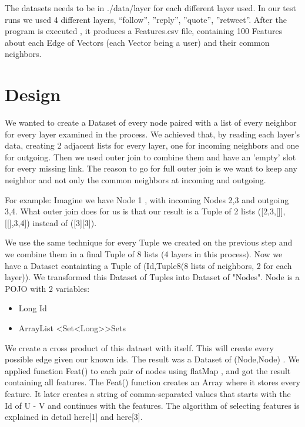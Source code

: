 The datasets needs to be in ./data/{layer} for each different layer used. \newline 
In our test runs we used 4 different layers, “follow”, ”reply”, ”quote”, ”retweet”.
After the program is executed , it produces a Features.csv file, containing 100 Features about each Edge of Vectors (each Vector being a user) and their common neighbors. 




\section{Design}
We wanted to create a Dataset of every node paired with a list of every neighbor for every layer examined in the process. We achieved that, by reading each layer's data, creating 2 adjacent lists for every layer, one for incoming neighbors and one for outgoing. Then we used outer join to combine them and have an 'empty' slot for every missing link. The reason to go for full outer join is we want to keep any neighbor and not only the common neighbors at incoming and outgoing.

For example: Imagine we have Node 1 , with incoming Nodes 2,3 and outgoing 3,4. What outer join does for us is that our result is a Tuple of 2 lists ([2,3,[]],[[],3,4]) instead of ([3][3]).

We use the same technique for every Tuple we created on the previous step and we combine them in a final Tuple of 8 lists (4 layers in this process).  Now we have a Dataset containting a Tuple of (Id,Tuple8(8 lists of neighbors, 2 for each layer)). 
We transformed this Dataset of Tuples into Dataset of "Nodes". Node is a POJO with 2 variables: 
\begin{itemize}
    \item Long Id
    \item ArrayList \textless Set\textless Long\textgreater \textgreater  Sets
\end{itemize}

We create a cross product of this dataset with itself. This will create every possible edge given our known ids. The result was a Dataset of (Node,Node) . We applied function Feat() to each pair of nodes using flatMap , and got the result containing all features. The Feat() function creates an Array where it stores every feature. It later creates a string of comma-separated values that starts with the Id of U - V and continues with the features.  The algorithm of selecting features is explained in detail here[1] and here[3]. 

